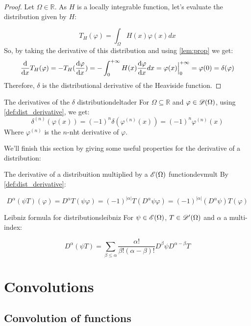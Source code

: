 \begin{proof}
    Let $\Omega\in\mathbb{R}$. As $H$ is a locally integrable function, let's evaluate the distribution given by $H$:

    \[T_H(\varphi) = \int_{\Omega}H(x)\varphi(x)dx\]
So, by taking the derivative of this distribution and using \cref{lem:prop} we get:
    \[\dv{}{x}T_H(\varphi) = -T_H(\dv{\varphi}{x}) = -\int_{0}^{+\infty}H(x)\dv{\varphi}{x}(x)dx = \varphi(x)\Big|_{0}^{+\infty} = \varphi(0) = \delta(\varphi)\]
Therefore, $\delta$ is the distributional derivative of the Heaviside function.

\end{proof}

\begin{example}{The derivatives of the $\delta$ distribution}{deltader}
    For $\Omega\subseteq\mathbb{R}$ and $\varphi\in\mathscr{D}(\Omega)$, using \cref{def:dist_derivative}, we get:
    \[\delta^{(n)}(\varphi(x)) = (-1)^n\delta(\varphi^{(n)}(x)) = (-1)^n\varphi^{(n)}(x)\]
    Where $\varphi^{(n)}$ is the $n$-nht derivative of $\varphi$.
\end{example}

We'll finish this section by giving some useful properties for the derivative of a distribution:
\begin{proposition}{The derivative of a distribuition multiplied by a $\mathscr{E}(\Omega)$ function}{devmult}
    By \cref{def:dist_derivative}:

    \[D^\alpha(\psi T)(\varphi) = D^\alpha T(\psi\varphi) = (-1)^{\left\lvert\alpha\right\rvert}T(D^\alpha\psi\varphi) = (-1)^{\left\lvert\alpha\right\rvert}(D^\alpha\psi)T(\varphi)\]
    
\end{proposition}

\begin{theorem}{Leibniz formula for distributions}{leibniz}
    For $\psi\in\mathscr{E}(\Omega)$, $T\in\mathscr{D}'(\Omega)$ and $\alpha$ a multi-index:

    \[D^\alpha(\psi T) = \sum_{\beta\leq\alpha}\frac{\alpha!}{\beta!(\alpha-\beta)!}D^\beta\psi D^{\alpha-\beta}T\]

\end{theorem}


\section{Convolutions}

\subsection{Convolution of functions}

